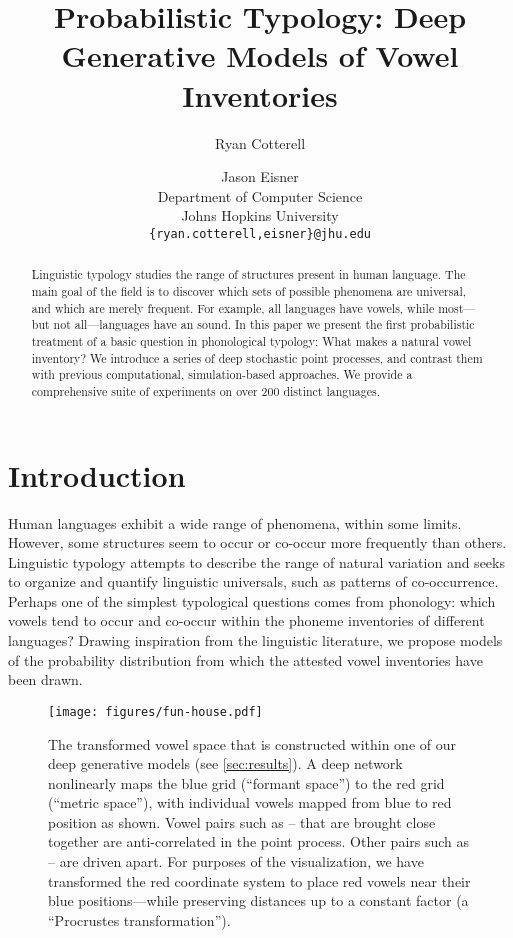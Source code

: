 \documentclass[11pt,a4paper]{article}
\title{Probabilistic Typology: Deep Generative Models of Vowel Inventories}
\author{Ryan Cotterell \and Jason Eisner \\
Department of Computer Science \\
Johns Hopkins University \\
{\tt \{ryan.cotterell,eisner\}@jhu.edu}}
\newcommand{\phone}[1]{\textipa{[#1]}}
\begin{document}
\maketitle

\begin{abstract}
\vspace{-1pt}
  Linguistic typology studies the range of structures present in human
  language. The main goal of the field is to discover which sets of
  possible phenomena are universal, and which are merely frequent. For
  example, all languages have vowels, while most---but not
  all---languages have an \phone{u} sound. In this paper we present the first
  probabilistic treatment of a basic question in phonological
  typology: What makes a natural vowel inventory?  We introduce a
  series of deep stochastic point processes, and contrast them with
  previous computational, simulation-based approaches.  We provide a comprehensive suite of experiments on over 200 distinct languages.
\end{abstract}

\section{Introduction}\label{sec:intro}

Human languages exhibit a wide
range of phenomena, within some limits.  However, some
structures seem to occur or co-occur more frequently than others.
Linguistic typology attempts to describe the range of natural
variation and seeks to organize and quantify linguistic universals,
such as patterns of co-occurrence. Perhaps one of the simplest
typological questions comes from phonology: which vowels tend to occur
and co-occur within the phoneme inventories of different languages?
Drawing inspiration from the linguistic literature, we
propose models of the probability distribution from which the attested
vowel inventories have been drawn.

\begin{figure}[t]
  \vspace*{-10pt}
  \texttt{[image: figures/fun-house.pdf]}
  \caption{The transformed vowel space that is constructed within one of our deep generative models (see \cref{sec:results}).  A deep network nonlinearly maps the blue grid (``formant space'') to the red grid (``metric space''), with individual vowels mapped from blue to red position as shown.  Vowel pairs such as \phone{@}--\phone{O} that are brought close together are anti-correlated in the point process.  Other pairs such as \phone{y}--\phone{\textbari} are driven apart. For purposes of the visualization, we have transformed the red coordinate system to place red vowels near their blue positions---while preserving distances up to a constant factor (a ``Procrustes transformation'').}
  \label{fig:perceptual-space}
\vspace{-8pt}
\end{figure}
\end{document}
